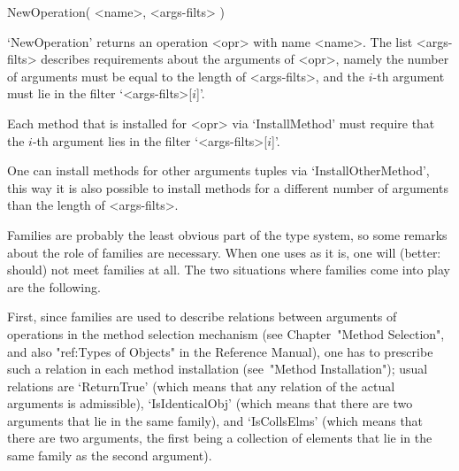 \>NewOperation( <name>, <args-filts> )

`NewOperation' returns an operation <opr> with name <name>.
The list <args-filts> describes requirements about the arguments
of <opr>, namely the number of arguments must be equal to the length of
<args-filts>, and the $i$-th argument must lie in the filter
`<args-filts>[$i$]'.

Each method that is installed for <opr> via `InstallMethod' must require
that the $i$-th argument lies in the filter `<args-filts>[$i$]'.

One can install methods for other arguments tuples via
`InstallOtherMethod',
this way it is also possible to install methods for a different number
of arguments than the length of <args-filts>.



Families are probably the least obvious part of the {\GAP} type system,
so some remarks about the role of families are necessary.
When one uses {\GAP} as it is, one will (better: should) not meet
families at all.
The two situations where families come into play are the following.

First, since families are used to describe relations between arguments of
operations in the method selection mechanism
(see Chapter~"Method Selection",
and also "ref:Types of Objects" in the Reference Manual),
one has to prescribe such a relation in each method installation
(see~"Method Installation");
usual relations are `ReturnTrue' (which means that any relation of the
actual arguments is admissible), `IsIdenticalObj' (which means that
there are two arguments that lie in the same family),
and `IsCollsElms' (which means that there are two arguments,
the first being a collection of elements that lie in the same family
as the second argument).

